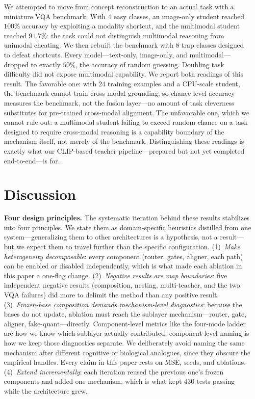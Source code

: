 \documentclass[10pt,twoside]{article}
\theoremstyle{definition}
\begin{document}
We attempted to move from concept reconstruction to an actual task with a miniature VQA benchmark. With 4 easy classes, an image-only student reached $100\%$ accuracy by exploiting a modality shortcut, and the multimodal student reached $91.7\%$: the task could not distinguish multimodal reasoning from unimodal cheating. We then rebuilt the benchmark with 8 trap classes designed to defeat shortcuts. Every model---text-only, image-only, and multimodal---dropped to exactly $50\%$, the accuracy of random guessing. Doubling task difficulty did not expose multimodal capability. We report both readings of this result. The favorable one: with 24 training examples and a CPU-scale student, the benchmark cannot train cross-modal grounding, so chance-level accuracy measures the benchmark, not the fusion layer---no amount of task cleverness substitutes for pre-trained cross-modal alignment. The unfavorable one, which we cannot rule out: a multimodal student failing to exceed random chance on a task designed to require cross-modal reasoning is a capability boundary of the mechanism itself, not merely of the benchmark. Distinguishing these readings is exactly what our CLIP-based \citep{radford2021} teacher pipeline---prepared but not yet completed end-to-end---is for.

\section{Discussion}
\label{sec:discussion}

\textbf{Four design principles.} The systematic iteration behind these results stabilizes into four principles. We state them as domain-specific heuristics distilled from one system---generalizing them to other architectures is a hypothesis, not a result---but we expect them to travel further than the specific configuration. (1)~\emph{Make heterogeneity decomposable}: every component (router, gates, aligner, each path) can be enabled or disabled independently, which is what made each ablation in this paper a one-flag change. (2)~\emph{Negative results are map boundaries}: five independent negative results (composition, nesting, multi-teacher, and the two VQA failures) did more to delimit the method than any positive result. (3)~\emph{Frozen-base composition demands mechanism-level diagnostics}: because the bases do not update, ablation must reach the sublayer mechanism---router, gate, aligner, fake-quant---directly. Component-level metrics like the four-mode ladder are how we know which sublayer actually contributed; component-level naming is how we keep those diagnostics separate. We deliberately avoid naming the same mechanism after different cognitive or biological analogues, since they obscure the empirical handles. Every claim in this paper rests on MSE, seeds, and ablations. (4)~\emph{Extend incrementally}: each iteration reused the previous one's frozen components and added one mechanism, which is what kept 430 tests passing while the architecture grew.
\end{document}
